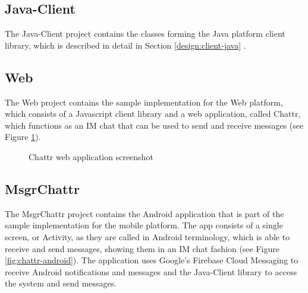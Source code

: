 \subsection{Java-Client}
The Java-Client project contains the classes forming the Java platform client library, which is described in detail in Section \ref{design:client-java} .

\subsection{Web}
The Web project contains the sample implementation for the Web platform, which consists of a Javascript client library and a web application, called Chattr, which functions as an IM chat that can be used to send and receive messages (see Figure \ref{fig:chattr-web}).

\begin{figure}[!ht]
	\centering
    \caption{Chattr web application screenshot}
    \label{fig:chattr-web}
\end{figure}

\subsection{MsgrChattr}
The MsgrChattr project contains the Android application that is part of the sample implementation for the mobile platform. The app consists of a single screen, or Activity, as they are called in Android terminology, which is able to receive and send messages, showing them in an IM chat fashion (see Figure \ref{fig:chattr-android}). The application uses Google's Firebase Cloud Messaging to receive Android notifications and messages and the Java-Client library to access the system and send messages.

